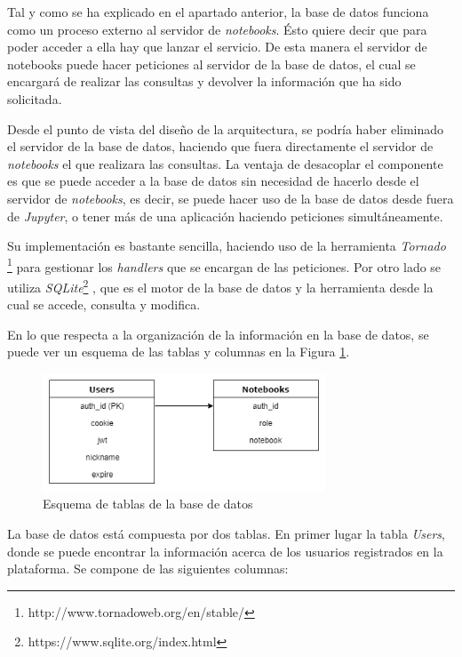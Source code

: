 \documentclass[11pt,spanish,listoffigures]{tfgetsinf}
\begin{document}
Tal y como se ha explicado en el apartado anterior, la base de datos funciona como un proceso externo al servidor de \textit{notebooks}. Ésto quiere decir que para poder acceder a ella hay que lanzar el servicio. De esta manera el servidor de notebooks puede hacer peticiones al servidor de la base de datos, el cual se encargará de realizar las consultas y devolver la información que ha sido solicitada. 

Desde el punto de vista del diseño de la arquitectura, se podría haber eliminado el servidor de la base de datos, haciendo que fuera directamente el servidor de \textit{notebooks} el que realizara las consultas. La ventaja de desacoplar el componente es que se puede acceder a la base de datos sin necesidad de hacerlo desde el servidor de \textit{notebooks}, es decir, se puede hacer uso de la base de datos desde fuera de \textit{Jupyter}, o tener más de una aplicación haciendo peticiones simultáneamente. 

Su implementación es bastante sencilla, haciendo uso de la herramienta \textit{Tornado}  \footnote{http://www.tornadoweb.org/en/stable/} para gestionar los \textit{handlers} que se encargan de las peticiones. Por otro lado se utiliza \textit{SQLite}\footnote{https://www.sqlite.org/index.html} , que es el motor de la base de datos y la herramienta desde la cual se accede, consulta y modifica. 

En lo que respecta a la organización de la información en la base de datos, se puede ver un esquema de las tablas y columnas en la Figura \ref{fig:db-scheme}. 

\begin{figure}[h]
	\centering
  	\includegraphics[width=0.75\textwidth]{database.png}
  	\caption{Esquema de tablas de la base de datos}
  	\label{fig:db-scheme}
\end{figure}

La base de datos está compuesta por dos tablas. En primer lugar la tabla \textit{Users}, donde se puede encontrar la información acerca de los usuarios registrados en la plataforma. Se compone de las siguientes columnas:
\end{document}
